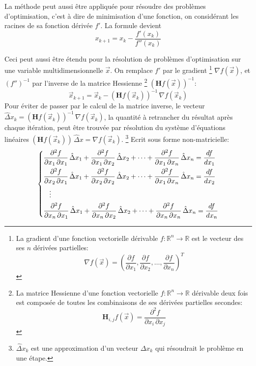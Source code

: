 \documentclass[a4paper,10pt]{scrreprt}
\begin{document}
La méthode peut aussi être appliquée pour résoudre des problèmes d'optimisation, c'est à dire de minimisation d'une fonction, on considérant les racines de sa fonction dérivée $f'$. La formule devient
\begin{equation}
	x_{k+1} = x_{k} - \frac{f'(x_k)}{f''(x_k)}
\end{equation}

Ceci peut aussi être étendu pour la résolution de problèmes d'optimisation sur une variable multidimensionnelle $\vec{x}$. On remplace $f'$ par le gradient
\footnote{La gradient d'une fonction vectorielle dérivable $f : \mathbb{R}^n \rightarrow \mathbb{R}$ est le vecteur des ses $n$ dérivées partielles: $$\nabla f(\vec{x}) = \left( \frac{\partial f}{\partial x_1}, \frac{\partial f}{\partial x_2}, \ldots, \frac{\partial f}{\partial x_n} \right)^T$$}
$\nabla f(\vec{x})$, et $(f'')^{-1}$ par l'inverse de la matrice Hessienne
\footnote{La matrice Hessienne d'une fonction vectorielle $f : \mathbb{R}^n \rightarrow \mathbb{R}$ dérivable deux fois est composée de toutes les combinaisons de ses dérivées partielles secondes: $$\mathbf{H}_{i,j} f(\vec{x}) = \frac{\partial^2 f}{\partial x_i \, \partial x_j}$$}
$( \mathbf{H} f(\vec{x}) )^{-1}$:
\begin{equation}
	\vec{x}_{k+1} = \vec{x}_{k} - (\mathbf{H} f(\vec{x}_k))^{-1} \, \nabla f(\vec{x}_k)
\end{equation}
Pour éviter de passer par le calcul de la matrice inverse, le vecteur $\hat{\Delta} x_k = (\mathbf{H} f(\vec{x}_k))^{-1} \, \nabla f(\vec{x}_k)$, la quantité à retrancher du résultat après chaque itération, peut être trouvée par résolution du système d'équations linéaires $(\mathbf{H} f(\vec{x}_k)) \, \hat{\Delta} x = \nabla f(\vec{x}_k)$.
\footnote{$\hat{\Delta} x_k$ est une approximation d'un vecteur $\Delta x_k$ qui résoudrait le problème en une étape.}
Ecrit sous forme non-matricielle:
\begin{equation}
\begin{dcases}
	\frac{\partial^2 f}{\partial x_1 \, \partial x_1} \, \hat{\Delta} x_1 + \frac{\partial^2 f}{\partial x_1 \, \partial x_2} \, \hat{\Delta} x_2 + \dotsb + \frac{\partial^2 f}{\partial x_1 \, \partial x_n} \, \hat{\Delta} x_n = \frac{d f}{d x_1} \\
	\frac{\partial^2 f}{\partial x_2 \, \partial x_1} \, \hat{\Delta} x_1 + \frac{\partial^2 f}{\partial x_2 \, \partial x_2} \, \hat{\Delta} x_2 + \dotsb + \frac{\partial^2 f}{\partial x_1 \, \partial x_n} \, \hat{\Delta} x_n = \frac{d f}{d x_2} \\
	\hspace{3mm} \vdots \\
	\frac{\partial^2 f}{\partial x_n \, \partial x_1} \, \hat{\Delta} x_1 + \frac{\partial^2 f}{\partial x_n \, \partial x_2} \, \hat{\Delta} x_2 + \dotsb + \frac{\partial^2 f}{\partial x_n \, \partial x_n} \, \hat{\Delta} x_n = \frac{d f}{d x_n} \\
\end{dcases}
\end{equation}
\end{document}
